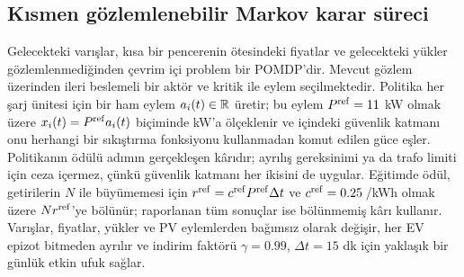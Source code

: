 \subsection{Kısmen gözlemlenebilir Markov karar süreci}\label{sec:mdp}

Gelecekteki varışlar, kısa bir pencerenin ötesindeki fiyatlar ve gelecekteki yükler gözlemlenmediğinden çevrim içi problem bir POMDP'dir.
Mevcut gözlem üzerinden ileri beslemeli bir aktör ve kritik ile eylem seçilmektedir.
Politika her şarj ünitesi için bir ham eylem $a_i(t)\in\mathbb R$ üretir; bu eylem $P^{\mathrm{ref}}=11$ kW olmak üzere $x_i(t)=P^{\mathrm{ref}}a_i(t)$ biçiminde kW'a ölçeklenir ve  içindeki güvenlik katmanı onu herhangi bir sıkıştırma fonksiyonu kullanmadan komut edilen güce eşler.
Politikanın ödülü adımın gerçekleşen kârıdır; ayrılış gereksinimi ya da trafo limiti için ceza içermez, çünkü güvenlik katmanı her ikisini de uygular.
Eğitimde ödül, getirilerin $N$ ile büyümemesi için $r^{\mathrm{ref}}=c^{\mathrm{ref}}P^{\mathrm{ref}}\Delta t$ ve $c^{\mathrm{ref}}=0.25$\,\texteuro/kWh olmak üzere $N r^{\mathrm{ref}}$'ye bölünür; raporlanan tüm sonuçlar ise bölünmemiş kârı kullanır.
Varışlar, fiyatlar, yükler ve PV eylemlerden bağımsız olarak değişir, her EV epizot bitmeden ayrılır ve indirim faktörü $\gamma=0.99$, $\Delta t=15$ dk için yaklaşık bir günlük etkin ufuk sağlar.
